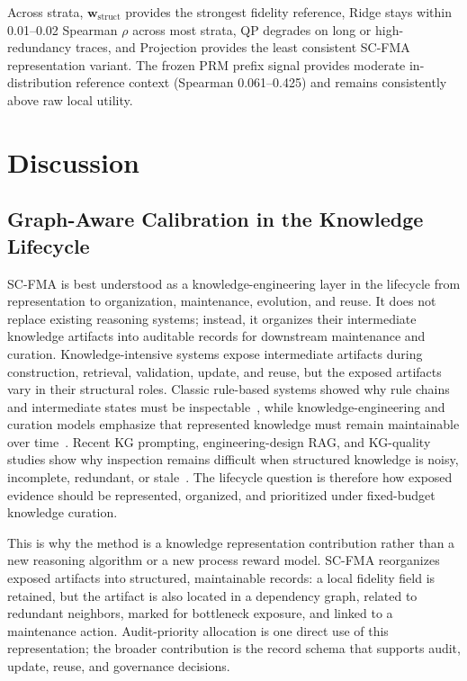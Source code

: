 \documentclass[a4paper,fleqn]{cas-sc}
\newcommand{\wstruct}{\ensuremath{\mathbf{w}_{\mathrm{struct}}}}
\begin{document}
Across strata, \wstruct{} provides the strongest fidelity reference, Ridge stays within 0.01--0.02 Spearman $\rho$ across most strata, QP degrades on long or high-redundancy traces, and Projection provides the least consistent SC-FMA representation variant. The frozen PRM prefix signal provides moderate in-distribution reference context (Spearman 0.061--0.425) and remains consistently above raw local utility.

\section{Discussion}
\label{sec:discussion}

\subsection{Graph-Aware Calibration in the Knowledge Lifecycle}
\label{sec:knowledge-lifecycle}

SC-FMA is best understood as a knowledge-engineering layer in the lifecycle from representation to organization, maintenance, evolution, and reuse. It does not replace existing reasoning systems; instead, it organizes their intermediate knowledge artifacts into auditable records for downstream maintenance and curation. Knowledge-intensive systems expose intermediate artifacts during construction, retrieval, validation, update, and reuse, but the exposed artifacts vary in their structural roles. Classic rule-based systems showed why rule chains and intermediate states must be inspectable~\cite{buchanan1984mycin,laird2012soar}, while knowledge-engineering and curation models emphasize that represented knowledge must remain maintainable over time~\cite{studer1998knowledge,higgins2008dcc}. Recent KG prompting, engineering-design RAG, and KG-quality studies show why inspection remains difficult when structured knowledge is noisy, incomplete, redundant, or stale~\cite{dai2025llmkg,siddharth2024retrieval,chen2025kgquality}. The lifecycle question is therefore how exposed evidence should be represented, organized, and prioritized under fixed-budget knowledge curation.

This is why the method is a knowledge representation contribution rather than a new reasoning algorithm or a new process reward model. SC-FMA reorganizes exposed artifacts into structured, maintainable records: a local fidelity field is retained, but the artifact is also located in a dependency graph, related to redundant neighbors, marked for bottleneck exposure, and linked to a maintenance action. Audit-priority allocation is one direct use of this representation; the broader contribution is the record schema that supports audit, update, reuse, and governance decisions.
\end{document}
